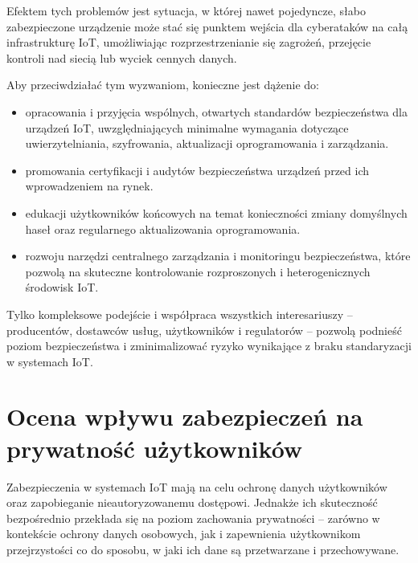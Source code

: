 Efektem tych problemów jest sytuacja, w której nawet pojedyncze, słabo zabezpieczone urządzenie może stać się punktem wejścia dla cyberataków na całą infrastrukturę IoT, umożliwiając rozprzestrzenianie się zagrożeń, przejęcie kontroli nad siecią lub wyciek cennych danych.

Aby przeciwdziałać tym wyzwaniom, konieczne jest dążenie do:

\begin{itemize}
\item opracowania i przyjęcia wspólnych, otwartych standardów bezpieczeństwa dla urządzeń IoT, uwzględniających minimalne wymagania dotyczące uwierzytelniania, szyfrowania, aktualizacji oprogramowania i zarządzania.

\item promowania certyfikacji i audytów bezpieczeństwa urządzeń przed ich wprowadzeniem na rynek.

\item edukacji użytkowników końcowych na temat konieczności zmiany domyślnych haseł oraz regularnego aktualizowania oprogramowania.

\item rozwoju narzędzi centralnego zarządzania i monitoringu bezpieczeństwa, które pozwolą na skuteczne kontrolowanie rozproszonych i heterogenicznych środowisk IoT.
\end{itemize}

Tylko kompleksowe podejście i współpraca wszystkich interesariuszy – producentów, dostawców usług, użytkowników i regulatorów – pozwolą podnieść poziom bezpieczeństwa i zminimalizować ryzyko wynikające z braku standaryzacji w systemach IoT.

\section{Ocena wpływu zabezpieczeń na prywatność użytkowników}
Zabezpieczenia w systemach IoT mają na celu ochronę danych użytkowników oraz zapobieganie nieautoryzowanemu dostępowi. Jednakże ich skuteczność bezpośrednio przekłada się na poziom zachowania prywatności – zarówno w kontekście ochrony danych osobowych, jak i zapewnienia użytkownikom przejrzystości co do sposobu, w jaki ich dane są przetwarzane i przechowywane. 
